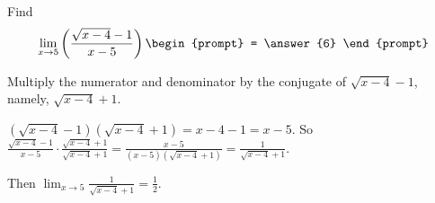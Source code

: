 \documentclass{ximera}
\author{Matthew Carr}
\begin{document}
\begin{exercise}



Find
\[
\lim_{x\to5}\left(\frac{\sqrt{x-4}-1}{x-5}\right)
\begin{prompt}
= \answer{6}
\end{prompt}
\]

\begin{hint}
Multiply the numerator and denominator by the conjugate of $\sqrt{x-4}-1$, namely, $\sqrt{x-4}+1$.
\end{hint}
\begin{hint}
$(\sqrt{x-4}-1)(\sqrt{x-4}+1)=x-4-1=x-5$. So $\frac{\sqrt{x-4}-1}{x-5}\cdot\frac{\sqrt{x-4}+1}{\sqrt{x-4}+1}=\frac{x-5}{(x-5)(\sqrt{x-4}+1)}=\frac{1}{\sqrt{x-4}+1}$.
\end{hint}
\begin{hint}
Then $\lim_{x\to5}\frac{1}{\sqrt{x-4}+1}=\frac{1}{2}$.
\end{hint}

\end{exercise}
\end{document}
